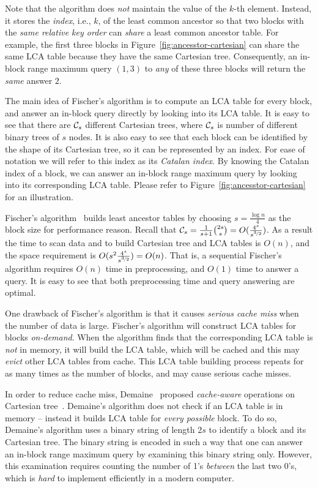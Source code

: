 Note that the algorithm does {\em not} maintain the value of the $k$-th
element.  Instead, it stores the {\em index}, i.e., $k$, of the least
common ancestor so that two blocks with the {\em same relative key
order} can {\em share} a least common ancestor table.  For example, the
first three blocks in Figure~\ref{fig:ancesstor-cartesian} can share the
same LCA table because they have the same Cartesian tree.  Consequently,
an in-block range maximum query $(1, 3)$ to {\em any} of these three
blocks will return the {\em same} answer $2$.

The main idea of Fischer's algorithm is to compute an LCA table for
every block, and answer an in-block query directly by looking into its
LCA table.  It is easy to see that there are ${\cal C}_s$ different Cartesian
trees, where ${\cal C}_s$ is number of different binary trees of $s$ nodes. It
is also easy to see that each block can be identified by the shape of
its Cartesian tree, so it can be represented by an index.  For ease of
notation we will refer to this index as its {\em Catalan index}. By
knowing the Catalan index of a block, we can answer an in-block range
maximum query by looking into its corresponding LCA table. Please refer
to Figure~\ref{fig:ancesstor-cartesian} for an illustration.

Fischer's algorithm~\cite{Fischer2006TheoreticalAP} builds least
ancestor tables by choosing $s = \frac{\log n}{4}$ as the block size for
performance reason.  Recall that ${\cal C}_s =
\frac{1}{s+1}\binom{2s}{s} = O(\frac{4^s}{s^{\nicefrac{3}{2}}})$.  As a
result the time to scan data and to build Cartesian tree and LCA tables
is $O(n)$, and the space requirement is $O(s^2
\frac{4^s}{s^{\nicefrac{3}{2}}}) = O(n)$.  That is, a sequential
Fischer's algorithm requires $O(n)$ time in preprocessing, and $O(1)$
time to answer a query.  It is easy to see that both preprocessing time
and query answering are optimal.

One drawback of Fischer's algorithm is that it causes {\em serious
  cache miss} when the number of data is large.  Fischer's algorithm
will construct LCA tables for blocks {\em on-demand}.  When the
algorithm finds that the corresponding LCA table is {\em not} in
memory, it will build the LCA table, which will be cached and this may
{\em evict} other LCA tables from cache.  This LCA table building
process repeats for as many times as the number of blocks, and may
cause serious cache misses.

In order to reduce cache miss, Demaine~\cite{Demaine2009OnCT} proposed
{\em cache-aware} operations on Cartesian
tree~\cite{Vuillemin1980AUL}.  Demaine's algorithm does not check if
an LCA table is in memory -- instead it builds LCA table for {\em
  every possible} block.  To do so, Demaine's algorithm uses a binary
string of length $2s$ to identify a block and its Cartesian tree.  The
binary string is encoded in such a way that one can answer an in-block
range maximum query by examining this binary string only.  However,
this examination requires counting the number of 1's {\em between} the
last two 0's, which is {\em hard} to implement efficiently in a modern
computer.


